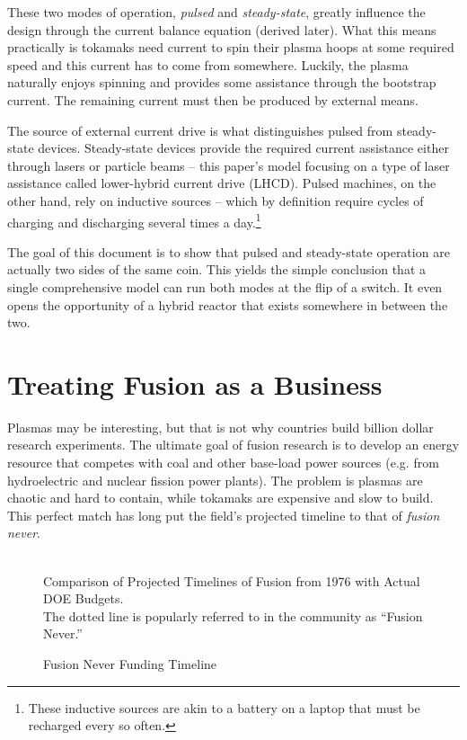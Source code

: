 These two modes of operation, \emph{pulsed} and \emph{steady-state}, greatly influence the design through the current balance equation (derived later). What this means practically is tokamaks need current to spin their plasma hoops at some required speed and this current has to come from somewhere. Luckily, the plasma naturally enjoys spinning and provides some assistance through the bootstrap current. The remaining current must then be produced by external means.

The source of external current drive is what distinguishes pulsed from steady-state devices. Steady-state devices provide the required current assistance either through lasers or particle beams -- this paper's model focusing on a type of laser assistance called lower-hybrid current drive (LHCD). \cite{jeff} Pulsed machines, on the other hand, rely on inductive sources -- which by definition require cycles of charging and discharging several times a day.\footnote{ These inductive sources are akin to a battery on a laptop that must be recharged every so often. }

The goal of this document is to show that pulsed and steady-state operation are actually two sides of the same coin. This yields the simple conclusion that a single comprehensive model can run both modes at the flip of a switch. It even opens the opportunity of a hybrid reactor that exists somewhere in between the two.

\section{Treating Fusion as a Business}

Plasmas may be interesting, but that is not why countries build billion dollar research experiments. The ultimate goal of fusion research is to develop an energy resource that competes with coal and other base-load power sources (e.g. from hydroelectric and nuclear fission power plants). The problem is plasmas are chaotic and hard to contain, while tokamaks are expensive and slow to build. This perfect match has long put the field's projected timeline to that of \emph{fusion never}. \cite{fusionfunding}

\begin{figure}[h]
	\centering
	\begin{adjustbox}{width=0.75\textwidth}
		
	\end{adjustbox}
	\caption{Fusion Never Funding Timeline} ~\\
	\small Comparison of Projected Timelines of Fusion from 1976 with Actual DOE Budgets. \cite{doe87, doe19} \\ The dotted line is popularly referred to in the community as ``Fusion Never.'' \cite{fusionnever}
\end{figure}

